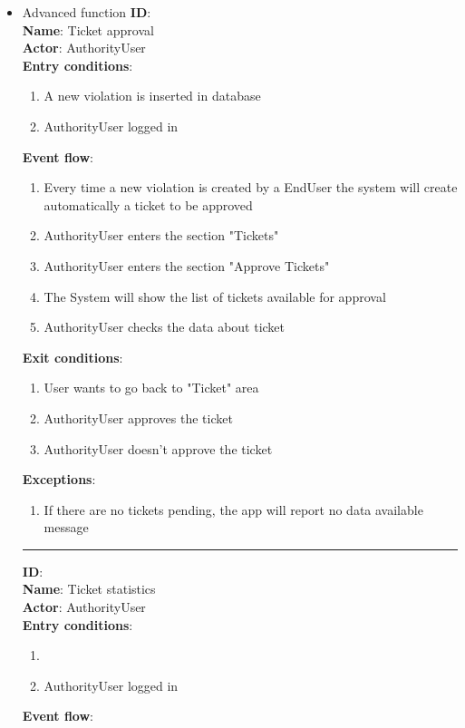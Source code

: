 \begin{enumerate}
\begin{itemize}
\item{Advanced function}
		\textbf{ID}:  \\
		\textbf{Name}: Ticket approval  \\
		\textbf{Actor}: AuthorityUser   \\
		\textbf{Entry conditions}:
		\begin{enumerate}
			\item{A new violation is inserted in database}
      \item{AuthorityUser logged in}
		\end{enumerate}
		\textbf{Event flow}:
		\begin{enumerate}
      \item{Every time a new violation is created by a EndUser the system will create automatically a ticket to be approved}
			\item{AuthorityUser enters the section "Tickets"}
			\item{AuthorityUser enters the section "Approve Tickets"}
      \item{The System will show the list of tickets available for approval }
      \item{AuthorityUser checks the data about ticket}
		\end{enumerate}
		\textbf{Exit conditions}:
    \begin{enumerate}
      \item{User wants to go back to "Ticket" area}
      \item{AuthorityUser approves the ticket}
      \item{AuthorityUser doesn't approve the ticket}
    \end{enumerate}
		\textbf{Exceptions}:
		\begin{enumerate}
			\item{If there are no tickets pending, the app will report no data available message}
		\end{enumerate}
		\rule{\linewidth}{0.4pt}

    \textbf{ID}:  \\
    \textbf{Name}: Ticket statistics  \\
    \textbf{Actor}: AuthorityUser   \\
    \textbf{Entry conditions}:
    \begin{enumerate}
      \item{}
      \item{AuthorityUser logged in}
    \end{enumerate}
    \textbf{Event flow}:
    \begin{enumerate}


\end{enumerate}
\end{itemize}
\end{enumerate}

